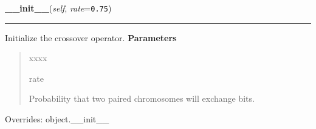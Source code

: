 \hspace{.8\funcindent}\begin{boxedminipage}{\funcwidth}

    \raggedright \textbf{\_\_init\_\_}(\textit{self}, \textit{rate}={\tt 0.75})

    \vspace{-1.5ex}

    \rule{\textwidth}{0.5\fboxrule}
\setlength{\parskip}{2ex}

Initialize the crossover operator.
\setlength{\parskip}{1ex}
      \textbf{Parameters}
      \vspace{-1ex}

      \begin{quote}
        \begin{Ventry}{xxxx}

          \item[rate]


Probability that two paired chromosomes will exchange bits.
        \end{Ventry}

      \end{quote}

      Overrides: object.\_\_init\_\_

    \end{boxedminipage}

    \label{peach:ga:crossover:TwoPoint:__call__}

    \vspace{0.5ex}

